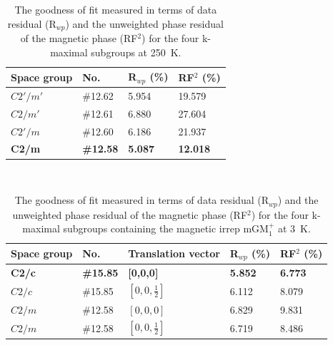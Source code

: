 \documentclass[10pt,doublespacing,edeposit]{uiucthesis2020}
\begin{document}
\begin{mainmatter}
\FloatBarrier

\begin{table}
\caption{\label{tab:refinement_250_K} 
The goodness of fit measured in terms of data residual (R$_{wp}$) and the unweighted phase residual of the magnetic phase (RF$^2$) for the four k-maximal subgroups at 250~K. 
}
\centering
\begin{tabular}{p{3cm}p{2.5cm}p{2.5cm}p{2.5cm}}
\hline\hline
\textbf{Space group} & \textbf{No.} & \textbf{R$_{wp}$ (\%)} & \textbf{RF$^2$ (\%)}\\
\hline\hline
$C2'/m'$ & $\#$12.62 & 5.954 &  19.579\\
$C2/m'$ & $\#$12.61 & 6.880 &  27.604\\
$C2'/m$ & $\#$12.60 & 6.186 &  21.937\\
\textbf{C2/m} & \textbf{\#12.58} & \textbf{5.087} &  \textbf{12.018}\\
\hline\hline
\end{tabular}
~\\
\end{table}

\begin{table}
\caption{\label{tab:refinement_3_K} 
The goodness of fit measured in terms of data residual (R$_{wp}$) and the unweighted phase residual of the magnetic phase (RF$^2$) for the four k-maximal subgroups containing the magnetic irrep mGM$_1^+$ at 3~K.
}
\centering
\begin{tabular}{p{3cm}p{2cm}p{3cm}p{2.5cm}p{2.5cm}}
\hline\hline
\textbf{Space group} & \textbf{No.} & \textbf{Translation vector} & \textbf{R$_{wp}$ (\%)} & \textbf{RF$^2$ (\%)}\\
\hline\hline
\textbf{C2/c} & \textbf{\#15.85} & \textbf{[0,0,0]} & \textbf{5.852} &  \textbf{6.773}\\
$C2/c$ & $\#$15.85 & $[0,0,\frac{1}{2}]$ & 6.112 &  8.079\\
$C2/m$ & $\#$12.58 & $[0,0,0]$ & 6.829 &  9.831\\
$C2/m$ & $\#$12.58 & $[0,0,\frac{1}{2}]$ & 6.719 &  8.486\\
\hline\hline
\end{tabular}
~\\
\end{table}


\end{mainmatter}
\end{document}
